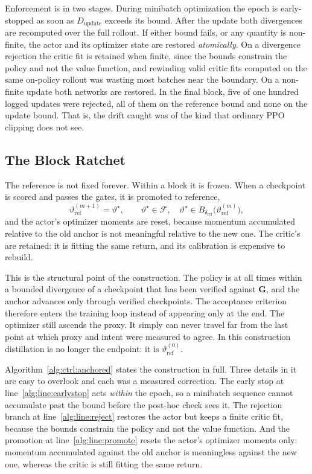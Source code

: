 Enforcement is in two stages. During minibatch optimization the epoch is
early-stopped as soon as $D_{\mathrm{update}}$ exceeds its bound. After the
update both divergences are recomputed over the full rollout. If either bound
fails, or any quantity is non-finite, the actor and its optimizer state are
restored \emph{atomically}. On a divergence rejection the critic fit is
retained when finite, since the bounds constrain the policy and not the value
function, and rewinding valid critic fits computed on the same on-policy
rollout was wasting most batches near the boundary. On a non-finite update both
networks are restored. In the final block, five of one hundred logged updates
were rejected, all of them on the reference bound and none on the update
bound. That is, the drift caught was of the kind that ordinary PPO
clipping does not see.

\subsection{The Block Ratchet}

The reference is not fixed forever. Within a block it is frozen. When a
checkpoint is scored and passes the gates, it is promoted to reference,
%
\begin{equation}
  \label{eq:ctrl:ratchet}
  \vartheta_{\mathrm{ref}}^{(m+1)} = \vartheta^{\star},
  \qquad
  \vartheta^{\star} \in \mathcal{F},
  \quad
  \vartheta^{\star} \in
  B_{\delta_{\mathrm{ref}}}\bigl(\vartheta_{\mathrm{ref}}^{(m)}\bigr),
\end{equation}
%
and the actor's optimizer moments are reset, because momentum accumulated
relative to the old anchor is not meaningful relative to the new one. The
critic's are retained: it is fitting the same return, and its calibration is
expensive to rebuild.

This is the structural point of the construction. The policy is at all times
within a bounded divergence of a checkpoint that has been verified against
$\bm{G}$, and the anchor advances only through verified checkpoints. The
acceptance criterion therefore enters the training loop instead of appearing
only at the end. The optimizer still ascends the proxy. It simply can never
travel far from the last point at which proxy and intent were measured to
agree. In this construction distillation is no longer the endpoint: it is
$\vartheta_{\mathrm{ref}}^{(0)}$.

Algorithm~\ref{alg:ctrl:anchored} states the construction in full. Three
details in it are easy to overlook and each was a measured correction. The
early stop at line~\ref{alg:line:earlystop} acts \emph{within} the epoch, so a
minibatch sequence cannot accumulate past the bound before the post-hoc check
sees it. The rejection branch at line~\ref{alg:line:reject} restores the actor
but keeps a finite critic fit, because the bounds constrain the policy and not
the value function. And the promotion at line~\ref{alg:line:promote} resets the
actor's optimizer moments only: momentum accumulated against the old anchor is
meaningless against the new one, whereas the critic is still fitting the same
return.

